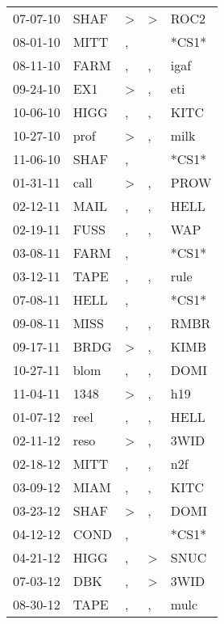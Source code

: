 \begin{supertabular}{lllll}
 07-07-10 &   SHAF &  \textgreater &  \textgreater &   ROC2 \\
 08-01-10 &   MITT &             , &               &  *CS1* \\
 08-11-10 &   FARM &             , &             , &   igaf \\
 09-24-10 &    EX1 &  \textgreater &             , &    eti \\
 10-06-10 &   HIGG &             , &             , &   KITC \\
 10-27-10 &   prof &  \textgreater &             , &   milk \\
 11-06-10 &   SHAF &             , &               &  *CS1* \\
 01-31-11 &   call &  \textgreater &             , &   PROW \\
 02-12-11 &   MAIL &             , &             , &   HELL \\
 02-19-11 &   FUSS &             , &             , &    WAP \\
 03-08-11 &   FARM &             , &               &  *CS1* \\
 03-12-11 &   TAPE &             , &             , &   rule \\
 07-08-11 &   HELL &             , &               &  *CS1* \\
 09-08-11 &   MISS &             , &             , &   RMBR \\
 09-17-11 &   BRDG &  \textgreater &             , &   KIMB \\
 10-27-11 &   blom &             , &             , &   DOMI \\
 11-04-11 &   1348 &  \textgreater &             , &    h19 \\
 01-07-12 &   reel &             , &             , &   HELL \\
 02-11-12 &   reso &  \textgreater &             , &   3WID \\
 02-18-12 &   MITT &             , &             , &    n2f \\
 03-09-12 &   MIAM &             , &             , &   KITC \\
 03-23-12 &   SHAF &  \textgreater &             , &   DOMI \\
 04-12-12 &   COND &             , &               &  *CS1* \\
 04-21-12 &   HIGG &             , &  \textgreater &   SNUC \\
 07-03-12 &    DBK &             , &  \textgreater &   3WID \\
 08-30-12 &   TAPE &             , &             , &   mulc \\

\end{supertabular}
